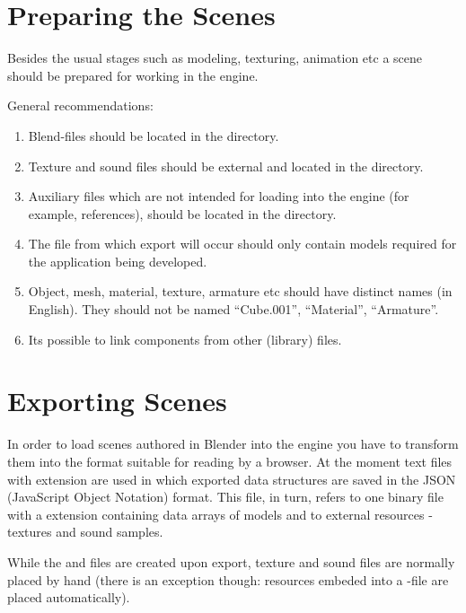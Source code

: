 \documentclass[a4paper,12pt,oneside]{sphinxmanual}
\begin{document}
\section{Preparing the Scenes}
\label{workflow:id2}
Besides the usual stages such as modeling, texturing, animation etc a scene should be prepared for working in the engine.

General recommendations:
\begin{enumerate}
\item {} 
Blend-files should be located in the  directory.

\item {} 
Texture and sound files should be external and located in the  directory.

\item {} 
Auxiliary files which are not intended for loading into the engine (for example, references), should be located in the  directory.

\item {} 
The file from which export will occur should only contain models required for the application being developed.

\item {} 
Object, mesh, material, texture, armature etc should have distinct names (in English). They should not be named ``Cube.001'', ``Material'', ``Armature''.

\item {} 
Its possible to link components from other (library) files.

\end{enumerate}


\section{Exporting Scenes}
\label{workflow:index-0}\label{workflow:id3}
In order to load scenes authored in Blender into the engine you have to transform them into the format suitable for reading by a browser. At the moment text files with  extension are used in which exported data structures are saved in the JSON (JavaScript Object Notation) format. This file, in turn, refers to one binary file with a  extension containing data arrays of models and to external resources - textures and sound samples.

While the  and  files are created upon export, texture and sound files are normally placed by hand (there is an exception though: resources embeded into a -file are placed automatically).
\end{document}
